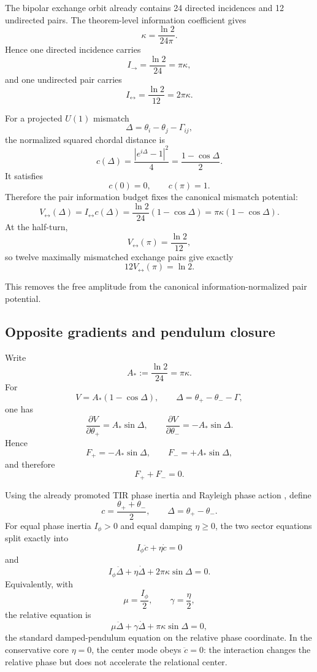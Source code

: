 \documentclass[11pt]{article}
\begin{document}
The bipolar exchange orbit already contains 24 directed incidences and 12
undirected pairs. The theorem-level information coefficient gives
\[
\kappa=\frac{\ln2}{24\pi}.
\]
Hence one directed incidence carries
\[
I_{\to}=\frac{\ln2}{24}=\pi\kappa,
\]
and one undirected pair carries
\[
I_{\leftrightarrow}=\frac{\ln2}{12}=2\pi\kappa.
\]

For a projected \(U(1)\) mismatch
\[
\Delta=\theta_i-\theta_j-\Gamma_{ij},
\]
the normalized squared chordal distance is
\[
c(\Delta)
=
\frac{|e^{i\Delta}-1|^2}{4}
=
\frac{1-\cos\Delta}{2}.
\]
It satisfies
\[
c(0)=0,
\qquad
c(\pi)=1.
\]
Therefore the pair information budget fixes the canonical mismatch potential:
\[
\boxed{
V_{\leftrightarrow}(\Delta)
=
I_{\leftrightarrow}c(\Delta)
=
\frac{\ln2}{24}(1-\cos\Delta)
=
\pi\kappa(1-\cos\Delta).
}
\]
At the half-turn,
\[
V_{\leftrightarrow}(\pi)=\frac{\ln2}{12},
\]
so twelve maximally mismatched exchange pairs give exactly
\[
\boxed{
12V_{\leftrightarrow}(\pi)=\ln2.
}
\]

This removes the free amplitude from the canonical information-normalized
pair potential.

\subsection{Opposite gradients and pendulum closure}

Write
\[
A_*:=\frac{\ln2}{24}=\pi\kappa.
\]
For
\[
V=A_*(1-\cos\Delta),
\qquad
\Delta=\theta_+-\theta_- -\Gamma,
\]
one has
\[
\frac{\partial V}{\partial\theta_+}
=
A_*\sin\Delta,
\qquad
\frac{\partial V}{\partial\theta_-}
=
-A_*\sin\Delta.
\]
Hence
\[
\boxed{
F_+=-A_*\sin\Delta,
\qquad
F_-=+A_*\sin\Delta,
}
\]
and therefore
\[
\boxed{
F_++F_-=0.
}
\]

Using the already promoted TIR phase inertia and Rayleigh phase action
\cite{LipaTIRWhiteThread2026}, define
\[
c=\frac{\theta_++\theta_-}{2},
\qquad
\Delta=\theta_+-\theta_-.
\]
For equal phase inertia \(I_\phi>0\) and equal damping \(\eta\ge0\), the
two sector equations split exactly into
\[
\boxed{
I_\phi\ddot c+\eta\dot c=0
}
\]
and
\[
\boxed{
I_\phi\ddot\Delta
+
\eta\dot\Delta
+
2\pi\kappa\sin\Delta
=
0.
}
\]
Equivalently, with
\[
\mu=\frac{I_\phi}{2},
\qquad
\gamma=\frac{\eta}{2},
\]
the relative equation is
\[
\boxed{
\mu\ddot\Delta
+
\gamma\dot\Delta
+
\pi\kappa\sin\Delta
=
0,
}
\]
the standard damped-pendulum equation on the relative phase coordinate. In
the conservative core \(\eta=0\), the center mode obeys \(\ddot c=0\):
the interaction changes the relative phase but does not accelerate the
relational center.
\end{document}
